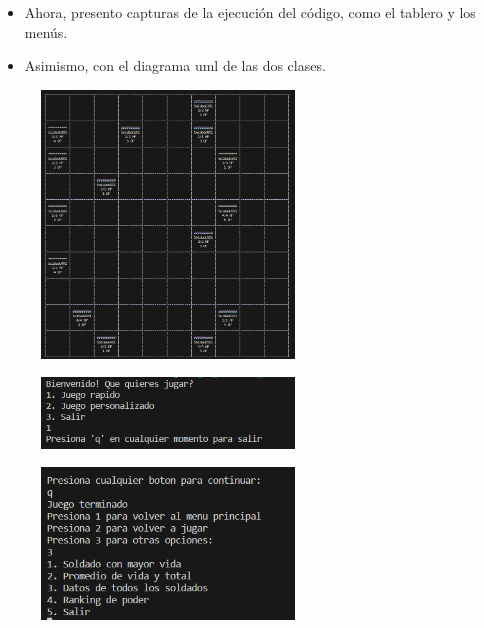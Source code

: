 \documentclass{article}
\begin{document}
	\begin{itemize}
		\item Ahora, presento capturas de la ejecución del código, como el tablero y los menús.
		\item Asimismo, con el diagrama uml de las dos clases.
	\end{itemize}
	\begin{figure}[H]
		\centering
	\includegraphics[width=0.6\textwidth,keepaspectratio]{img/tablero.png}
	\end{figure}
	\begin{figure}[H]
		\centering
	\includegraphics[width=0.6\textwidth,keepaspectratio]{img/menu1.png}
	\end{figure}
	\begin{figure}[H]
		\centering
	\includegraphics[width=0.6\textwidth,keepaspectratio]{img/menu2.png}
	\end{figure}
\end{document}
